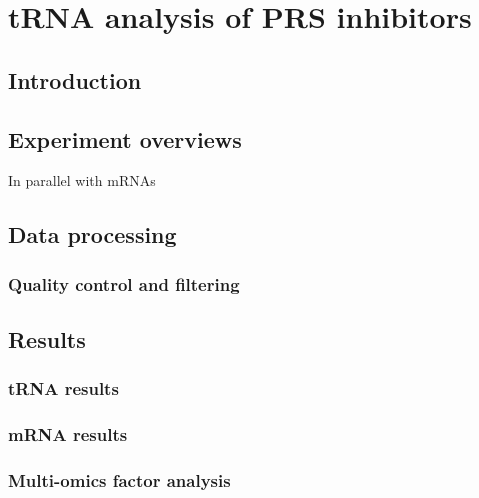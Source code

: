 \chapter{\label{ch:6-trna}tRNA analysis of PRS inhibitors}

\section{Introduction}


\section{Experiment overviews}
In parallel with mRNAs

\section{Data processing}

\subsection{Quality control and filtering}

\section{Results}

\subsection{tRNA results}

\subsection{mRNA results}

\subsection{Multi-omics factor analysis}
